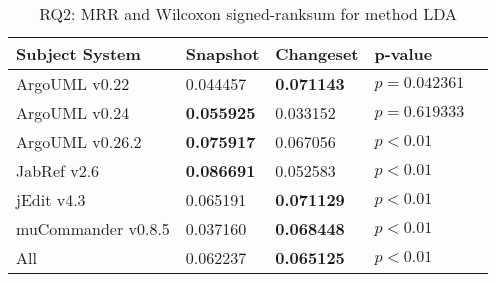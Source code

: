 
\begin{table}[t]
\renewcommand{\arraystretch}{1.3}
\footnotesize
\centering
\caption{RQ2: MRR and Wilcoxon signed-ranksum for method LDA}
\begin{tabular}{l|ll|ll}
   \toprule
    Subject System & Snapshot & Changeset & p-value  \\
    \midrule

ArgoUML v0.22 & 0.044457 & {\bf 0.071143 } & $p = 0.042361$ \\
ArgoUML v0.24 & {\bf 0.055925 } & 0.033152 & $p = 0.619333$ \\
ArgoUML v0.26.2 & {\bf 0.075917 } & 0.067056 & $p < 0.01$ \\
JabRef v2.6 & {\bf 0.086691 } & 0.052583 & $p < 0.01$ \\
jEdit v4.3 & 0.065191 & {\bf 0.071129 } & $p < 0.01$ \\
muCommander v0.8.5 & 0.037160 & {\bf 0.068448 } & $p < 0.01$ \\
\midrule
All & 0.062237 & {\bf 0.065125 } & $p < 0.01$ \\

    \bottomrule
\end{tabular}
\label{table:rq2:method:lda}
\end{table}

